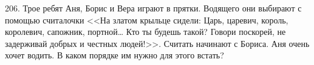 206. Трое ребят Аня, Борис и Вера играют в прятки. Водящего они выбирают с помощью считалочки <<На златом крыльце сидели: Царь, царевич, король, королевич, сапожник, портной… Кто ты будешь такой? Говори поскорей, не задерживай добрых и честных людей!>>. Считать начинают с Бориса. Аня очень хочет водить.  В каком порядке им нужно для этого встать?\\
